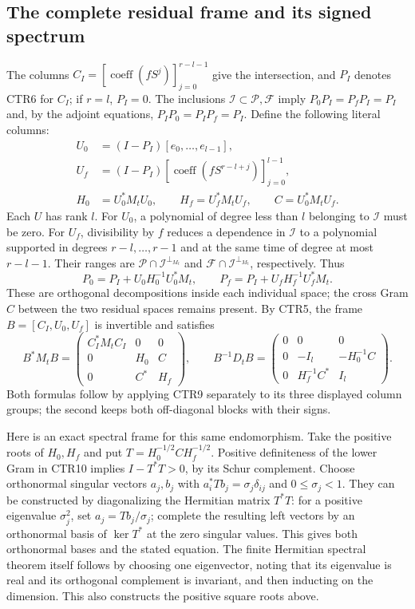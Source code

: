 \documentclass[11pt,a4paper]{article}
\begin{document}
\subsection{The complete residual frame and its signed spectrum}
The columns $C_I=[\operatorname{coeff}(fS^j)]_{j=0}^{r-l-1}$ give the
intersection, and $P_I$ denotes CTR6 for $C_I$; if $r=l$, $P_I=0$.
The inclusions $\mathcal I\subset\mathcal P,\mathcal F$ imply
$P_0P_I=P_fP_I=P_I$ and, by the adjoint equations,
$P_IP_0=P_IP_f=P_I$. Define the following literal columns:
\[
 \begin{split}
 U_0&=(I-P_I)[e_0,\ldots,e_{l-1}],\\
 U_f&=(I-P_I)[\operatorname{coeff}(fS^{r-l+j})]_{j=0}^{l-1},\\
 H_0&=U_0^*M_tU_0,\qquad H_f=U_f^*M_tU_f,\qquad C=U_0^*M_tU_f.
 \end{split}
 \tag{CTR8}
\]
Each $U$ has rank $l$. For $U_0$, a polynomial of degree less than $l$
belonging to $\mathcal I$ must be zero. For $U_f$, divisibility by $f$
reduces a dependence in $\mathcal I$ to a polynomial supported in degrees
$r-l,\ldots,r-1$ and at the same time of degree at most $r-l-1$.
Their ranges are $\mathcal P\cap\mathcal I^{\perp_{M_t}}$ and
$\mathcal F\cap\mathcal I^{\perp_{M_t}}$, respectively. Thus
\[
 P_0=P_I+U_0H_0^{-1}U_0^*M_t,\qquad
 P_f=P_I+U_fH_f^{-1}U_f^*M_t.
 \tag{CTR9}
\]
These are orthogonal decompositions inside each individual space; the
cross Gram $C$ between the two residual spaces remains present.
By CTR5, the frame $B=[C_I,U_0,U_f]$ is invertible and satisfies
\[
 B^*M_tB=
 \begin{pmatrix}C_I^*M_tC_I&0&0\\0&H_0&C\\0&C^*&H_f\end{pmatrix},\qquad
 B^{-1}D_tB=
 \begin{pmatrix}0&0&0\\0&-I_l&-H_0^{-1}C\\0&H_f^{-1}C^*&I_l\end{pmatrix}.
 \tag{CTR10}
\]
Both formulas follow by applying CTR9 separately to its three displayed
column groups; the second keeps both off-diagonal blocks with their signs.

Here is an exact spectral frame for this same endomorphism. Take the
positive roots of $H_0,H_f$ and put
$T=H_0^{-1/2}CH_f^{-1/2}$. Positive definiteness of the lower Gram in
CTR10 implies $I-T^*T>0$, by its Schur complement. Choose orthonormal
singular vectors $a_j,b_j$ with
$a_i^*Tb_j=\sigma_j\delta_{ij}$ and $0\leq\sigma_j<1$.
They can be constructed by diagonalizing the Hermitian matrix $T^*T$:
for a positive eigenvalue $\sigma_j^2$, set $a_j=Tb_j/\sigma_j$;
complete the resulting left vectors by an orthonormal basis of
$\ker T^*$ at the zero singular values. This gives both orthonormal
bases and the stated equation. The finite Hermitian spectral theorem
itself follows by choosing one eigenvector, noting that its eigenvalue
is real and its orthogonal complement is invariant, and then inducting
on the dimension. This also constructs the positive square roots above.
\end{document}

